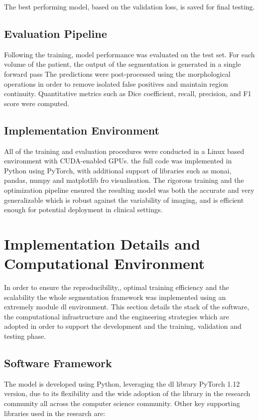 The best performing model, based on the validation loss, is saved for final testing.

\subsection{Evaluation Pipeline}
Following the training, model performance was evaluated on the test set. For each volume of the patient, the output of the segmentation is generated in a single forward pass The predictions were post-processed using the morphological operations in order to remove isolated false positives and maintain region continuity. Quantitative metrics such as Dice coefficient, recall, precision, and F1 score were computed.

\subsection{Implementation Environment}
All of the training and evaluation procedures were conducted in a Linux based environment with CUDA-enabled GPUs. the full code was implemented in Python using PyTorch, with additional support of libraries such as monai, pandas, numpy and matplotlib fro visualisation. The rigorous training and the optimization pipeline ensured the resulting model was both the accurate and very generalizable which is robust against the variability of imaging, and is efficient enough for potential deployment in clinical settings.

\section{Implementation Details and Computational Environment}

In order to ensure the reproducibility,, optimal training efficiency and the scalability the whole segmentation framework was implemented using an extremely module \gls{dl} environment. This section details the stack of the software, the computational infrastructure and the engineering strategies which are adopted in order to support the development and the training, validation and testing phase.

\subsection{Software Framework}
The model is developed using Python, leveraging the \gls{dl} library PyTorch 1.12 version, due to its flexibility and the wide adoption of the library in the research community all across the computer science community. Other key supporting libraries used in the research are:

